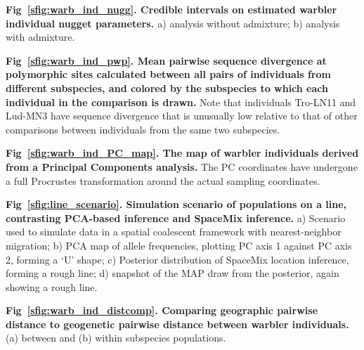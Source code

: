 \documentclass[10pt,letterpaper]{article}
\begin{document}
\label{warb_ind_nugg}
{\bf{Fig\ \ref{sfig:warb_ind_nugg}. Credible intervals on estimated warbler individual nugget parameters. }} a) analysis without admixture; b) analysis with admixture.

\label{warb_ind_pwp}
{\bf{Fig\ \ref{sfig:warb_ind_pwp}. Mean pairwise sequence divergence at polymorphic sites calculated between all pairs of individuals from different subspecies, and colored by the subspecies to which each individual in the comparison is drawn.}} Note that individuals Tro-LN11 and Lud-MN3 have sequence divergence that is unusually low relative to that of other comparisons between individuals from the same two subspecies.

\label{warb_ind_PC_map}
{\bf{Fig\ \ref{sfig:warb_ind_PC_map}. The map of warbler individuals derived from a Principal Components analysis.}} The PC coordinates have undergone a full Procrustes transformation around the actual sampling coordinates.

\label{line_scenario}
{\bf{Fig\ \ref{sfig:line_scenario}. Simulation scenario of populations on a line, contrasting PCA-based inference and SpaceMix inference.}} a) Scenario used to simulate data in a spatial coalescent framework with nearest-neighbor migration; b) PCA map of allele frequencies, plotting PC axis 1 against PC axis 2, forming a `U' shape; c) Posterior distribution of SpaceMix location inference, forming a rough line; d) snapshot of the MAP draw from the posterior, again showing a rough line.

\label{warb_ind_distcomp}
{\bf{Fig\ \ref{sfig:warb_ind_distcomp}. Comparing geographic pairwise distance to geogenetic pairwise distance between warbler individuals.}} 
(a) between and (b) within subspecies populations.
\end{document}

